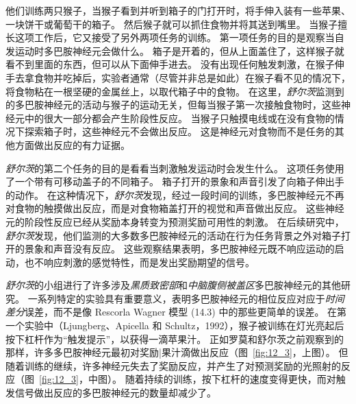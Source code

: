 他们训练两只猴子，当猴子看到并听到箱子的门打开时，将手伸入装有一些苹果、一块饼干或葡萄干的箱子。
然后猴子就可以抓住食物并将其送到嘴里。
当猴子擅长这项工作后，它又接受了另外两项任务的训练。
第一项任务的目的是观察当自发运动时多巴胺神经元会做什么。
箱子是开着的，但从上面盖住了，这样猴子就看不到里面的东西，但可以从下面伸手进去。
没有出现任何触发刺激，在猴子伸手去拿食物并吃掉后，实验者通常（尽管并非总是如此）在猴子看不见的情况下，将食物粘在一根坚硬的金属丝上，以取代箱子中的食物。
在这里，\textit{舒尔茨}监测到的多巴胺神经元的活动与猴子的运动无关，但每当猴子第一次接触食物时，这些神经元中的很大一部分都会产生阶段性反应。
当猴子只触摸电线或在没有食物的情况下探索箱子时，这些神经元不会做出反应。
这是神经元对食物而不是任务的其他方面做出反应的有力证据。


\textit{舒尔茨}的第二个任务的目的是看看当刺激触发运动时会发生什么。
这项任务使用了一个带有可移动盖子的不同箱子。
箱子打开的景象和声音引发了向箱子伸出手的动作。
在这种情况下，\textit{舒尔茨}发现，经过一段时间的训练，多巴胺神经元不再对食物的触摸做出反应，而是对食物箱盖打开的视觉和声音做出反应。
这些神经元的阶段性反应已经从奖励本身转变为预测奖励可用性的刺激。
在后续研究中，\textit{舒尔茨}发现，他们监测的大多数多巴胺神经元的活动在行为任务背景之外对箱子打开的景象和声音没有反应。
这些观察结果表明，多巴胺神经元既不响应运动的启动，也不响应刺激的感觉特性，而是发出奖励期望的信号。


\textit{舒尔茨}的小组进行了许多涉及\textit{黑质致密部}和\textit{中脑腹侧被盖区}多巴胺神经元的其他研究。
一系列特定的实验具有重要意义，表明多巴胺神经元的相位反应对应于\textit{时间差分}误差，而不是像 Rescorla Wagner 模型 (14.3) 中的那些更简单的误差。
在第一个实验中（Ljungberg、Apicella 和 Schultz，1992），猴子被训练在灯光亮起后按下杠杆作为“触发提示”，以获得一滴苹果汁。
正如罗莫和舒尔茨之前观察到的那样，许多多巴胺神经元最初对奖励|果汁滴做出反应（图~\ref{fig:12_3}，上图）。
但随着训练的继续，许多神经元失去了奖励反应，并产生了对预测奖励的光照射的反应（图~\ref{fig:12_3}，中图）。
随着持续的训练，按下杠杆的速度变得更快，而对触发信号做出反应的多巴胺神经元的数量却减少了。


